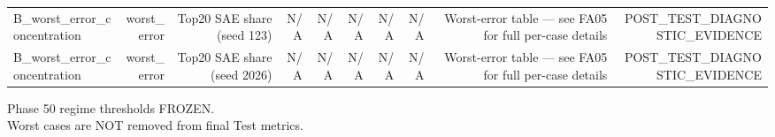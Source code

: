 \begin{table}[h!]
\begin{tabular}{lrrrrrrrrr}
B\_worst\_error\_concentration & worst\_error & Top20 SAE share (seed 123) & N/A & N/A & N/A & N/A & N/A & Worst-error table — see FA05 for full per-case details & POST\_TEST\_DIAGNOSTIC\_EVIDENCE \\
B\_worst\_error\_concentration & worst\_error & Top20 SAE share (seed 2026) & N/A & N/A & N/A & N/A & N/A & Worst-error table — see FA05 for full per-case details & POST\_TEST\_DIAGNOSTIC\_EVIDENCE \\
\bottomrule
\end{tabular}
\vspace{4pt}
\footnotesize{Phase 50 regime thresholds FROZEN.}\\
\footnotesize{Worst cases are NOT removed from final Test metrics.}\\
\end{table}
